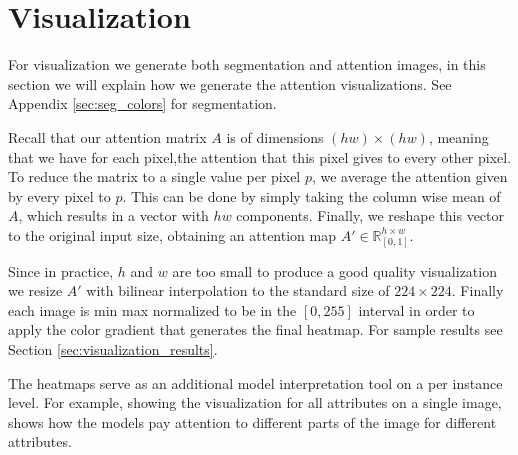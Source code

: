 \section{Visualization}
\label{sec:methodology_visualization}
For visualization we generate both segmentation and attention images, in this section
we will explain how we generate the attention visualizations. See Appendix \ref{sec:seg_colors} for segmentation.

Recall that our attention matrix $A$ is of dimensions $(hw)\times(hw)$, meaning that we
have for each pixel,the attention that this pixel gives to every other
pixel. To reduce the matrix to a single value per pixel $p$, we average the attention
given by every pixel to $p$. This can be done by
simply taking the column wise mean of $A$, which results in a vector with $hw$ components.
Finally, we reshape this vector to the original input size,
obtaining an attention map $A' \in \mathbb{R}_{[0,1]}^{h \times w}$.

Since in practice, $h$ and $w$ are too small to produce a good quality visualization we resize $A'$ with
bilinear interpolation to the standard size of $224 \times 224$. Finally each image is min max normalized to be in
the $[0, 255]$ interval in order to apply the color gradient that generates the final heatmap.
For sample results see Section \ref{sec:visualization_results}.

The heatmaps serve as an additional model interpretation
tool on a per instance level. For example, showing the visualization for all attributes on
a single image, shows how the models pay attention to different parts of the image for different
attributes.